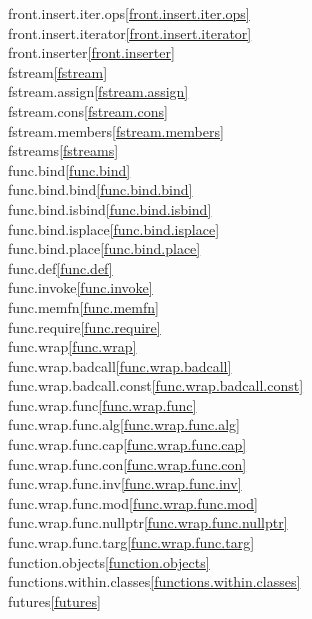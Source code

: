 \begin{multicols}{2}
front.insert.iter.ops\quad\ref{front.insert.iter.ops}\\
front.insert.iterator\quad\ref{front.insert.iterator}\\
front.inserter\quad\ref{front.inserter}\\
fstream\quad\ref{fstream}\\
fstream.assign\quad\ref{fstream.assign}\\
fstream.cons\quad\ref{fstream.cons}\\
fstream.members\quad\ref{fstream.members}\\
fstreams\quad\ref{fstreams}\\
func.bind\quad\ref{func.bind}\\
func.bind.bind\quad\ref{func.bind.bind}\\
func.bind.isbind\quad\ref{func.bind.isbind}\\
func.bind.isplace\quad\ref{func.bind.isplace}\\
func.bind.place\quad\ref{func.bind.place}\\
func.def\quad\ref{func.def}\\
func.invoke\quad\ref{func.invoke}\\
func.memfn\quad\ref{func.memfn}\\
func.require\quad\ref{func.require}\\
func.wrap\quad\ref{func.wrap}\\
func.wrap.badcall\quad\ref{func.wrap.badcall}\\
func.wrap.badcall.const\quad\ref{func.wrap.badcall.const}\\
func.wrap.func\quad\ref{func.wrap.func}\\
func.wrap.func.alg\quad\ref{func.wrap.func.alg}\\
func.wrap.func.cap\quad\ref{func.wrap.func.cap}\\
func.wrap.func.con\quad\ref{func.wrap.func.con}\\
func.wrap.func.inv\quad\ref{func.wrap.func.inv}\\
func.wrap.func.mod\quad\ref{func.wrap.func.mod}\\
func.wrap.func.nullptr\quad\ref{func.wrap.func.nullptr}\\
func.wrap.func.targ\quad\ref{func.wrap.func.targ}\\
function.objects\quad\ref{function.objects}\\
functions.within.classes\quad\ref{functions.within.classes}\\
futures\quad\ref{futures}\\

\end{multicols}
